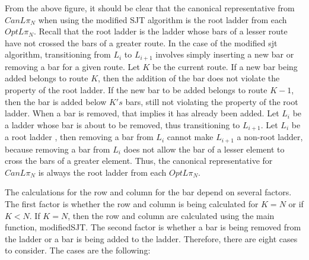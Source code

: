 

From the above figure, it should be clear that the canonical representative from $CanL{\pi_{N}}$ when using the 
modified SJT algorithm is the root ladder from each $OptL{\pi_{N}}$. Recall that the root ladder is the 
ladder whose bars of a lesser route have not crossed the bars of a greater route. In the case of the 
modified sjt algorithm, transitioning from $L_{i}$ to $L_{i+1}$ involves simply inserting a new bar 
or removing a bar for a given route. Let $K$ be the current route. If a new bar being added belongs to 
route $K$, then the addition of the bar does not violate the property of the root ladder. If the new bar to
be added belongs to route $K-1$, then the bar is added below $K's$ bars, still not violating the property of 
the root ladder. When a bar is removed, that implies it has already been added. Let $L_{i}$ be a 
ladder whose bar is about to be removed, thus transitioning to $L_{i+1}$. Let $L_{i}$ be a root ladder
, then removing a bar from $L_{i}$ cannot make $L_{i+1}$ a non-root ladder, because 
removing a bar from $L_{i}$ does not allow the bar of a lesser element to cross the bars of a greater element.
Thus, the canonical representative for $CanL{\pi_{N}}$ is always the root ladder from each $OptL{\pi_{N}}$.\par 



The calculations for the row and column for the bar 
depend on several factors. The first factor is whether the row and column is being calculated for $K=N$ or 
if $K < N$. If $K=N$, then the row and column are calculated using the main function, modifiedSJT. The second factor 
is whether a bar is being removed from the ladder or a bar is being added to the ladder. Therefore, there are eight cases 
to consider. The cases are the following: 
\begin{caseof}
\end{caseof}


